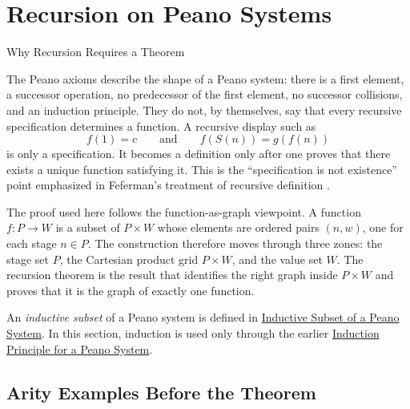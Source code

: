 \section{Recursion on Peano Systems}

\begin{topicbox}{Why Recursion Requires a Theorem}
\begin{exposition}
The Peano axioms describe the shape of a Peano system: there is a first
element, a successor operation, no predecessor of the first element, no
successor collisions, and an induction principle. They do not, by themselves,
say that every recursive specification determines a function. A recursive
display such as
\[
f(1)=c
\qquad\text{and}\qquad
f(S(n))=g(f(n))
\]
is only a specification. It becomes a definition only after one proves that
there exists a unique function satisfying it. This is the ``specification is
not existence'' point emphasized in Feferman's treatment of recursive
definition \cite[p.~67]{feferman1964numbersystems}.

The proof used here follows the function-as-graph viewpoint. A function
$f:P\to W$ is a subset of $P\times W$ whose elements are ordered pairs
$(n,w)$, one for each stage $n\in P$. The construction therefore moves through
three zones: the stage set $P$, the Cartesian product grid $P\times W$, and
the value set $W$. The recursion theorem is the result that identifies the
right graph inside $P\times W$ and proves that it is the graph of exactly one
function.
\end{exposition}

\begin{remark*}
An \emph{inductive subset} of a Peano system is defined in
\hyperref[def:inductive-subset-of-peano-system]{Inductive Subset of a Peano
System}. In this section, induction is used only through the earlier
\hyperref[thm:induction-principle-for-peano-system]{Induction Principle for a
Peano System}.
\end{remark*}
\end{topicbox}

\subsection{Arity Examples Before the Theorem}


